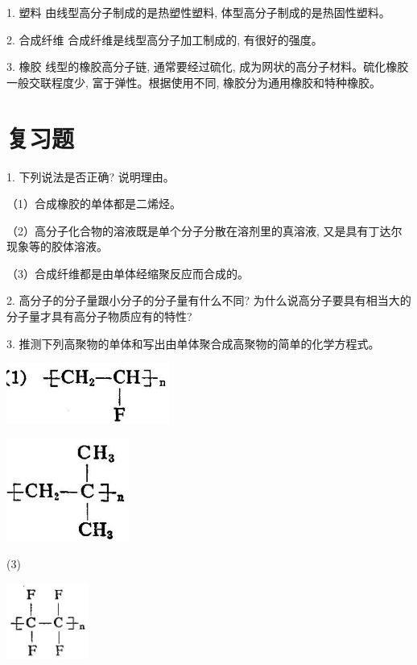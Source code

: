 \documentclass[10pt]{article}
\begin{document}
1. 塑料 由线型高分子制成的是热塑性塑料, 体型高分子制成的是热固性塑料。

2. 合成纤维 合成纤维是线型高分子加工制成的, 有很好的强度。

3. 橡胶 线型的橡胶高分子链, 通常要经过硫化, 成为网状的高分子材料。硫化橡胶一般交联程度少, 富于弹性。根据使用不同, 橡胶分为通用橡胶和特种橡胶。

\section*{复习题}

1. 下列说法是否正确? 说明理由。

（1）合成橡胶的单体都是二烯烃。

（2）高分子化合物的溶液既是单个分子分散在溶剂里的真溶液, 又是具有丁达尔现象等的胶体溶液。

（3）合成纤维都是由单体经缩聚反应而合成的。

2. 高分子的分子量跟小分子的分子量有什么不同? 为什么说高分子要具有相当大的分子量才具有高分子物质应有的特性?

3. 推测下列高聚物的单体和写出由单体聚合成高聚物的简单的化学方程式。

\begin{center}
\includegraphics[max width=0.4\textwidth]{images/01912d16-be99-77bb-9535-4f3ed8d9946f_203_228444.jpg}
\end{center}

\begin{center}
\includegraphics[max width=0.3\textwidth]{images/01912d16-be99-77bb-9535-4f3ed8d9946f_203_834693.jpg}
\end{center}

(3)

\begin{center}
\includegraphics[max width=0.2\textwidth]{images/01912d16-be99-77bb-9535-4f3ed8d9946f_203_788784.jpg}
\end{center}
\end{document}
